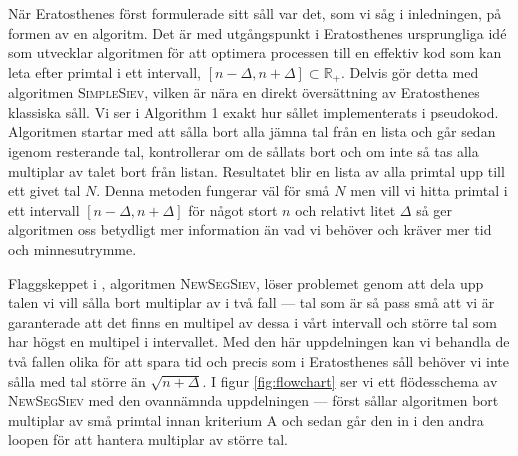 


När Eratosthenes först formulerade sitt såll var det, som vi såg i inledningen, på formen av en algoritm. Det är med utgångspunkt i Eratosthenes ursprungliga idé som \cite{HaraldSieve} utvecklar algoritmen för att optimera processen till en effektiv kod som kan leta efter primtal i ett intervall, $[n - \Delta, n + \Delta] \subset \mathbb{R}_+$. Delvis gör \cite{HaraldSieve} detta med algoritmen \textsc{SimpleSiev}, vilken är nära en direkt översättning av Eratosthenes klassiska såll. Vi ser i Algorithm 1 exakt hur sållet implementerats i pseudokod. Algoritmen startar med att sålla bort alla jämna tal från en lista och går sedan igenom resterande tal, kontrollerar om de sållats bort och om inte så tas alla multiplar av talet bort från listan. Resultatet blir en lista av alla primtal upp till ett givet tal $N$. Denna metoden fungerar väl för små $N$ men vill vi hitta primtal i ett intervall $[n - \Delta, n + \Delta]$ för något stort $n$ och relativt litet $\Delta$ så ger algoritmen oss betydligt mer information än vad vi behöver och kräver mer tid och minnesutrymme. 



Flaggskeppet i \cite{HaraldSieve}, algoritmen \textsc{NewSegSiev}, löser problemet genom att dela upp talen vi vill sålla bort multiplar av i två fall --- tal som är så pass små att vi är garanterade att det finns en multipel av dessa i vårt intervall och större tal som har högst en multipel i intervallet. Med den här uppdelningen kan vi behandla de två fallen olika för att spara tid och precis som i Eratosthenes såll behöver vi inte sålla med tal större än \(\sqrt{n + \Delta}\). I figur \ref{fig:flowchart} ser vi ett flödesschema av \textsc{NewSegSiev} med den ovannämnda uppdelningen --- först sållar algoritmen bort multiplar av små primtal innan kriterium A och sedan går den in i den andra loopen för att hantera multiplar av större tal. 

